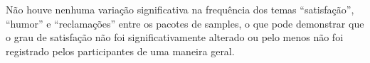

Não houve nenhuma variação significativa na frequência dos temas ``satisfação'', ``humor'' e ``reclamações'' entre os pacotes de samples, o que pode demonstrar que o grau de satisfação não foi significativamente alterado ou pelo menos não foi registrado pelos participantes de uma maneira geral. 




